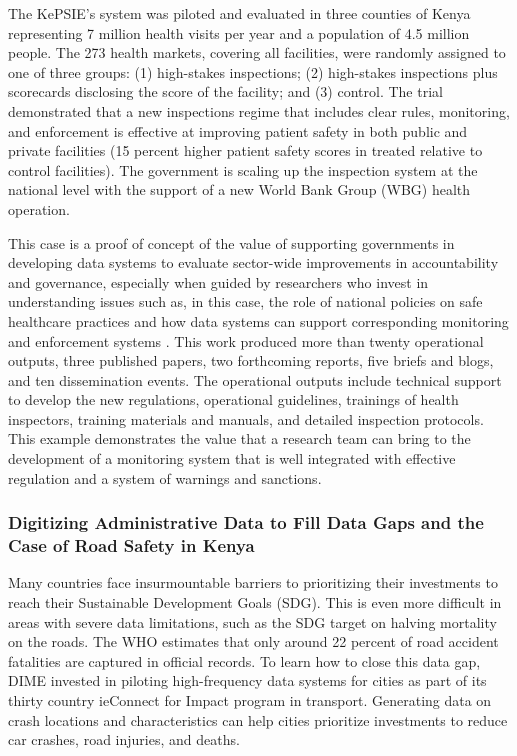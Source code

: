 The KePSIE's system was piloted and evaluated in three counties of Kenya representing 7 million health visits per year and a population of 4.5 million people. The 273 health markets, covering all facilities, were randomly assigned to one of three groups: (1) high-stakes inspections; (2) high-stakes inspections plus scorecards disclosing the score of the facility; and (3) control. The trial demonstrated that a new inspections regime that includes clear rules, monitoring, and enforcement is effective at improving patient safety in both public and private facilities (15 percent higher patient safety scores in treated relative to control facilities). The government is scaling up the inspection system at the national level with the support of a new World Bank Group (WBG) health operation. 

This case is a proof of concept of the value of supporting governments in developing data systems to evaluate sector-wide improvements in accountability and governance, especially when guided by researchers who invest in understanding issues such as, in this case, the role of national policies on safe healthcare practices and how data systems can support corresponding monitoring and enforcement systems \citep{worldhealthorganizationregionalofficeforafrica2014}.
This work produced more than twenty operational outputs, three published papers, two forthcoming reports, five briefs and blogs, and ten dissemination events. The operational outputs include technical support to develop the new regulations, operational guidelines, trainings of health inspectors, training materials and manuals, and detailed inspection protocols. This example demonstrates the value that a research team can bring to the development of a monitoring system that is well integrated with effective regulation and a system of warnings and sanctions.

\hypertarget{digitizing-administrative-data-to-fill-data-gaps-and-the-case-of-road-safety-in-kenya}{%
\subsubsection{Digitizing Administrative Data to Fill Data Gaps and the Case of Road Safety in Kenya}\label{digitizing-administrative-data-to-fill-data-gaps-and-the-case-of-road-safety-in-kenya}}

Many countries face insurmountable barriers to prioritizing their investments to reach their Sustainable Development Goals (SDG). This is even more difficult in areas with severe data limitations, such as the SDG target on halving mortality on the roads. The WHO estimates that only around 22 percent of road accident fatalities are captured in official records. To learn how to close this data gap, DIME invested in piloting high-frequency data systems for cities as part of its thirty country ieConnect for Impact program in transport. Generating data on crash locations and characteristics can help cities prioritize investments to reduce car crashes, road injuries, and deaths.

